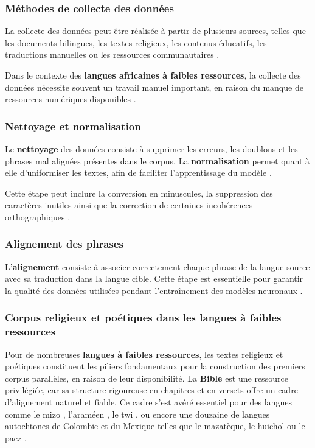 \subsubsection{Méthodes de collecte des données}

La collecte des données peut être réalisée à partir de plusieurs sources, telles que les documents bilingues, les textes religieux, les contenus éducatifs, les traductions manuelles ou les ressources communautaires \cite{haulai2023construction, jindal2017building}.

Dans le contexte des \textbf{langues africaines à faibles ressources}, la collecte des données nécessite souvent un travail manuel important, en raison du manque de ressources numériques disponibles \cite{agyei2024low, mandiya2026lingala}.

\subsubsection{Nettoyage et normalisation}

Le \textbf{nettoyage} des données consiste à supprimer les erreurs, les doublons et les phrases mal alignées présentes dans le corpus. La \textbf{normalisation} permet quant à elle d'uniformiser les textes, afin de faciliter l'apprentissage du modèle \cite{sharma2023fully}.

Cette étape peut inclure la conversion en minuscules, la suppression des caractères inutiles ainsi que la correction de certaines incohérences orthographiques \cite{ali2026hybrid}.

\subsubsection{Alignement des phrases}

L'\textbf{alignement} consiste à associer correctement chaque phrase de la langue source avec sa traduction dans la langue cible. Cette étape est essentielle pour garantir la qualité des données utilisées pendant l'entraînement des modèles neuronaux \cite{ali2026hybrid, haulai2023construction}.

\subsubsection{Corpus religieux et poétiques dans les langues à faibles ressources}

Pour de nombreuses \textbf{langues à faibles ressources}, les textes religieux et poétiques constituent les piliers fondamentaux pour la construction des premiers corpus parallèles, en raison de leur disponibilité. La \textbf{Bible} est une ressource privilégiée, car sa structure rigoureuse en chapitres et en versets offre un cadre d'alignement naturel et fiable. Ce cadre s'est avéré essentiel pour des langues comme le mizo \cite{chanambam2022, haulai2023construction}, l'araméen \cite{liebeskind2024machine}, le twi \cite{agyei2024low}, ou encore une douzaine de langues autochtones de Colombie et du Mexique telles que le mazatèque, le huichol ou le paez \cite{angel2023comparing}.

